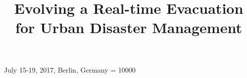 \documentclass{sig-alternate-05-2015}
\begin{document}
 {July 15-19, 2017, Berlin, Germany}
\widowpenalty = 10000

\title{Evolving a Real-time Evacuation for Urban Disaster Management}

%
%
%
%
%

%
\end{document}
